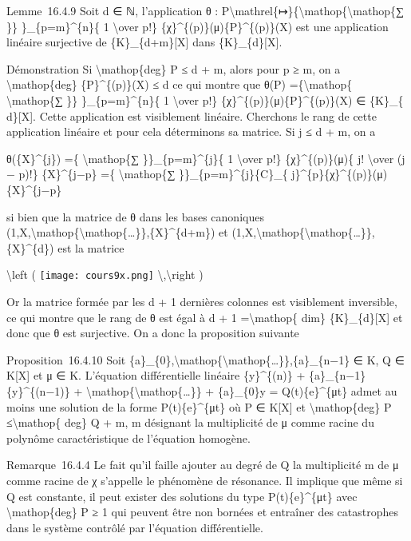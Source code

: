 \documentclass[]{article}
\begin{document}
Lemme~16.4.9 Soit d ∈ ℕ, l'application θ :
P\textbackslash{}mathrel\{↦\}\{\textbackslash{}mathop\{\textbackslash{}mathop\{∑
\}\} \}\_\{p=m\}\^{}\{n\}\{ 1 \textbackslash{}over p!\}
\{χ\}\^{}\{(p)\}(μ)\{P\}\^{}\{(p)\}(X) est une application linéaire
surjective de \{K\}\_\{d+m\}{[}X{]} dans \{K\}\_\{d\}{[}X{]}.

Démonstration Si \textbackslash{}mathop\{deg\} P ≤ d + m, alors pour p ≥
m, on a \textbackslash{}mathop\{deg\} \{P\}\^{}\{(p)\}(X) ≤ d ce qui
montre que θ(P) =\{\textbackslash{}mathop\{ \textbackslash{}mathop\{∑
\}\} \}\_\{p=m\}\^{}\{n\}\{ 1 \textbackslash{}over p!\}
\{χ\}\^{}\{(p)\}(μ)\{P\}\^{}\{(p)\}(X) ∈ \{K\}\_\{ d\}{[}X{]}. Cette
application est visiblement linéaire. Cherchons le rang de cette
application linéaire et pour cela déterminons sa matrice. Si j ≤ d + m,
on a

θ(\{X\}\^{}\{j\}) =\{ \textbackslash{}mathop\{∑ \}\}\_\{p=m\}\^{}\{j\}\{
1 \textbackslash{}over p!\} \{χ\}\^{}\{(p)\}(μ)\{ j!
\textbackslash{}over (j − p)!\} \{X\}\^{}\{j−p\} =\{
\textbackslash{}mathop\{∑ \}\}\_\{p=m\}\^{}\{j\}\{C\}\_\{
j\}\^{}\{p\}\{χ\}\^{}\{(p)\}(μ)\{X\}\^{}\{j−p\}

si bien que la matrice de θ dans les bases canoniques
(1,X,\textbackslash{}mathop\{\textbackslash{}mathop\{\ldots{}\}\},\{X\}\^{}\{d+m\})
et
(1,X,\textbackslash{}mathop\{\textbackslash{}mathop\{\ldots{}\}\},\{X\}\^{}\{d\})
est la matrice

\textbackslash{}left ( \texttt{[image: cours9x.png]}
\textbackslash{},\textbackslash{}right )

Or la matrice formée par les d + 1 dernières colonnes est visiblement
inversible, ce qui montre que le rang de θ est égal à d + 1
=\textbackslash{}mathop\{ dim\} \{K\}\_\{d\}{[}X{]} et donc que θ est
surjective. On a donc la proposition suivante

Proposition~16.4.10 Soit
\{a\}\_\{0\},\textbackslash{}mathop\{\textbackslash{}mathop\{\ldots{}\}\},\{a\}\_\{n−1\}
∈ K, Q ∈ K{[}X{]} et μ ∈ K. L'équation différentielle linéaire
\{y\}\^{}\{(n)\} + \{a\}\_\{n−1\}\{y\}\^{}\{(n−1)\} +
\textbackslash{}mathop\{\textbackslash{}mathop\{\ldots{}\}\} +
\{a\}\_\{0\}y = Q(t)\{e\}\^{}\{μt\} admet au moins une solution de la
forme P(t)\{e\}\^{}\{μt\} où P ∈ K{[}X{]} et
\textbackslash{}mathop\{deg\} P ≤\textbackslash{}mathop\{ deg\} Q + m, m
désignant la multiplicité de μ comme racine du polynôme caractéristique
de l'équation homogène.

Remarque~16.4.4 Le fait qu'il faille ajouter au degré de Q la
multiplicité m de μ comme racine de χ s'appelle le phénomène de
résonance. Il implique que même si Q est constante, il peut exister des
solutions du type P(t)\{e\}\^{}\{μt\} avec \textbackslash{}mathop\{deg\}
P ≥ 1 qui peuvent être non bornées et entraîner des catastrophes dans le
système contrôlé par l'équation différentielle.
\end{document}
